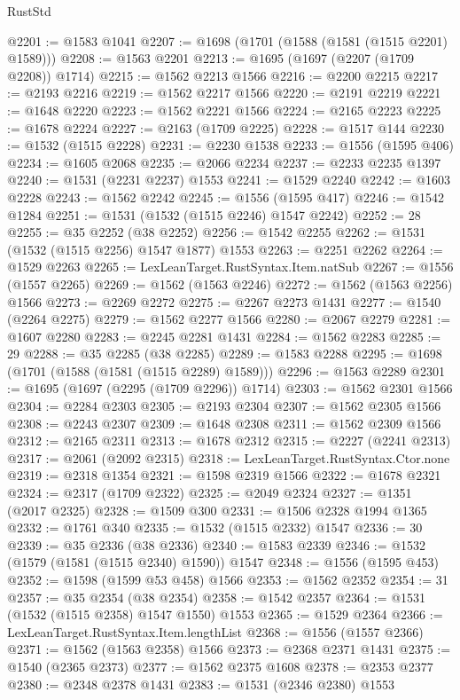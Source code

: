 \begin{lexlean}{RustStd}
\begin{coremodule}
@2201 := @1583 @1041
@2207 := @1698 (@1701 (@1588 (@1581 (@1515 @2201) @1589)))
@2208 := @1563 @2201
@2213 := @1695 (@1697 (@2207 (@1709 @2208)) @1714)
@2215 := @1562 @2213 @1566
@2216 := @2200 @2215
@2217 := @2193 @2216
@2219 := @1562 @2217 @1566
@2220 := @2191 @2219
@2221 := @1648 @2220
@2223 := @1562 @2221 @1566
@2224 := @2165 @2223
@2225 := @1678 @2224
@2227 := @2163 (@1709 @2225)
@2228 := @1517 @144
@2230 := @1532 (@1515 @2228)
@2231 := @2230 @1538
@2233 := @1556 (@1595 @406)
@2234 := @1605 @2068
@2235 := @2066 @2234
@2237 := @2233 @2235 @1397
@2240 := @1531 (@2231 @2237) @1553
@2241 := @1529 @2240
@2242 := @1603 @2228
@2243 := @1562 @2242
@2245 := @1556 (@1595 @417)
@2246 := @1542 @1284
@2251 := @1531 (@1532 (@1515 @2246) @1547 @2242)
@2252 := 28
@2255 := @35 @2252 (@38 @2252)
@2256 := @1542 @2255
@2262 := @1531 (@1532 (@1515 @2256) @1547 @1877) @1553
@2263 := @2251 @2262
@2264 := @1529 @2263
@2265 := LexLeanTarget.RustSyntax.Item.natSub
@2267 := @1556 (@1557 @2265)
@2269 := @1562 (@1563 @2246)
@2272 := @1562 (@1563 @2256) @1566
@2273 := @2269 @2272
@2275 := @2267 @2273 @1431
@2277 := @1540 (@2264 @2275)
@2279 := @1562 @2277 @1566
@2280 := @2067 @2279
@2281 := @1607 @2280
@2283 := @2245 @2281 @1431
@2284 := @1562 @2283
@2285 := 29
@2288 := @35 @2285 (@38 @2285)
@2289 := @1583 @2288
@2295 := @1698 (@1701 (@1588 (@1581 (@1515 @2289) @1589)))
@2296 := @1563 @2289
@2301 := @1695 (@1697 (@2295 (@1709 @2296)) @1714)
@2303 := @1562 @2301 @1566
@2304 := @2284 @2303
@2305 := @2193 @2304
@2307 := @1562 @2305 @1566
@2308 := @2243 @2307
@2309 := @1648 @2308
@2311 := @1562 @2309 @1566
@2312 := @2165 @2311
@2313 := @1678 @2312
@2315 := @2227 (@2241 @2313)
@2317 := @2061 (@2092 @2315)
@2318 := LexLeanTarget.RustSyntax.Ctor.none
@2319 := @2318 @1354
@2321 := @1598 @2319 @1566
@2322 := @1678 @2321
@2324 := @2317 (@1709 @2322)
@2325 := @2049 @2324
@2327 := @1351 (@2017 @2325)
@2328 := @1509 @300
@2331 := @1506 @2328 @1994 @1365
@2332 := @1761 @340
@2335 := @1532 (@1515 @2332) @1547
@2336 := 30
@2339 := @35 @2336 (@38 @2336)
@2340 := @1583 @2339
@2346 := @1532 (@1579 (@1581 (@1515 @2340) @1590)) @1547
@2348 := @1556 (@1595 @453)
@2352 := @1598 (@1599 @53 @458) @1566
@2353 := @1562 @2352
@2354 := 31
@2357 := @35 @2354 (@38 @2354)
@2358 := @1542 @2357
@2364 := @1531 (@1532 (@1515 @2358) @1547 @1550) @1553
@2365 := @1529 @2364
@2366 := LexLeanTarget.RustSyntax.Item.lengthList
@2368 := @1556 (@1557 @2366)
@2371 := @1562 (@1563 @2358) @1566
@2373 := @2368 @2371 @1431
@2375 := @1540 (@2365 @2373)
@2377 := @1562 @2375 @1608
@2378 := @2353 @2377
@2380 := @2348 @2378 @1431
@2383 := @1531 (@2346 @2380) @1553

\end{coremodule}
\end{lexlean}
